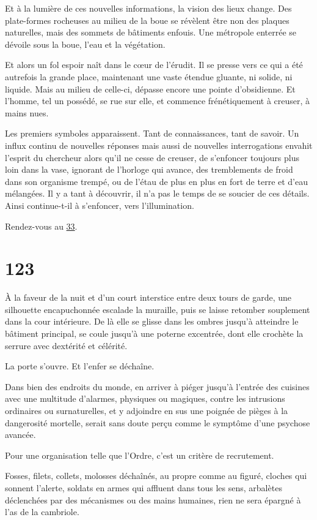 \documentclass{report}
\newcommand{\gsection}[1]{
    \section{#1}
    \label{section-#1}
}
\newcommand{\glink}[1]{\hyperref[section-#1]{#1}}
\begin{document}
Et à la lumière de ces nouvelles informations, la vision des lieux change. Des plate-formes rocheuses au milieu de la boue se révèlent être non des plaques naturelles, mais des sommets de bâtiments enfouis. Une métropole enterrée se dévoile sous la boue, l'eau et la végétation.

Et alors un fol espoir naît dans le cœur de l'érudit. Il se presse vers ce qui a été autrefois la grande place, maintenant une vaste étendue gluante, ni solide, ni liquide. Mais au milieu de celle-ci, dépasse encore une pointe d'obsidienne. Et l'homme, tel un possédé, se rue sur elle, et commence frénétiquement à creuser, à mains nues.

Les premiers symboles apparaissent. Tant de connaissances, tant de savoir. Un influx continu de nouvelles réponses mais aussi de nouvelles interrogations envahit l'esprit du chercheur alors qu'il ne cesse de creuser, de s'enfoncer toujours plus loin dans la vase, ignorant de l'horloge qui avance, des tremblements de froid dans son organisme trempé, ou de l'étau de plus en plus en fort de terre et d'eau mélangées. Il y a tant à découvrir, il n'a pas le temps de se soucier de ces détails. Ainsi continue-t-il à s'enfoncer, vers l'illumination.

Rendez-vous au \glink{33}.

\gsection{123}

À la faveur de la nuit et d'un court interstice entre deux tours de garde, une silhouette encapuchonnée escalade la muraille, puis se laisse retomber souplement dans la cour intérieure. De là elle se glisse dans les ombres jusqu'à atteindre le bâtiment principal, se coule jusqu'à une poterne excentrée, dont elle crochète la serrure avec dextérité et célérité.

La porte s'ouvre. Et l'enfer se déchaîne.

Dans bien des endroits du monde, en arriver à piéger jusqu'à l'entrée des cuisines avec une multitude d'alarmes, physiques ou magiques, contre les intrusions ordinaires ou surnaturelles, et y adjoindre en sus une poignée de pièges à la dangerosité mortelle, serait sans doute perçu comme le symptôme d'une psychose avancée.

Pour une organisation telle que l'Ordre, c'est un critère de recrutement.

Fosses, filets, collets, molosses déchaînés, au propre comme au figuré, cloches qui sonnent l'alerte, soldats en armes qui affluent dans tous les sens, arbalètes déclenchées par des mécanismes ou des mains humaines, rien ne sera épargné à l'as de la cambriole.
\end{document}

